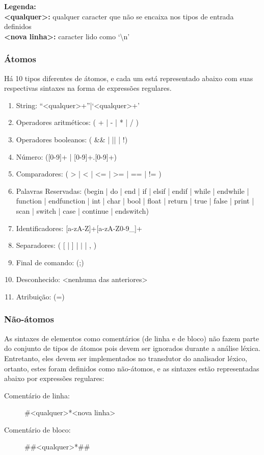 \textbf{Legenda:}\\
\textbf{<qualquer>:} qualquer caracter que não se encaixa nos tipos de entrada definidos\\
\textbf{<nova linha>:} caracter lido como `\textbackslash n'

\subsubsection{Átomos}

Há 10 tipos diferentes de átomos, e cada um está representado abaixo com suas respectivas sintaxes na forma de expressões regulares.

\begin{enumerate}
	\item String: ``<qualquer>+''|`<qualquer>+'
    \item Operadores aritméticos: ( + | - | * | / )
    \item Operadores booleanos: ( \&\& | || | !)
    \item Número: ([0-9]+ | [0-9]+.[0-9]+)
    \item Comparadores: ( > | < | <= | >= | == | != )
    \item Palavras Reservadas: (begin | do | end | if | elsif | endif | while | endwhile | function | endfunction | int | char | bool | float | return | true | false | print | scan | switch | case | continue | endswitch)
    \item Identificadores: [a-zA-Z]+[a-zA-Z0-9\_]+
    \item Separadores: ( [ | ] | \( | \) | , )
    \item Final de comando: (;)
    \item Desconhecido: <nenhuma das anteriores>    
    \item Atribuição: (=)
\end{enumerate}

\subsubsection{Não-átomos}

As sintaxes de elementos como comentários (de linha e de bloco) não fazem parte do conjunto de tipos de átomos pois devem ser ignorados durante a análise léxica. Entretanto, eles devem ser implementados no transdutor do analisador léxico, ortanto, estes foram definidos como não-átomos, e as sintaxes estão representadas abaixo por expressões regulares:

\begin{description}
	\item[Comentário de linha:] \#<qualquer>*<nova linha>
    \item[Comentário de bloco:] \#\#<qualquer>*\#\#
\end{description}

